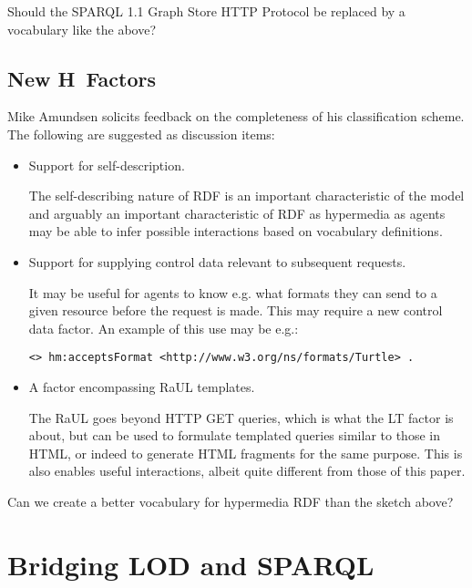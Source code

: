 \documentclass{llncs}
\begin{document}
\begin{question}
Should the SPARQL 1.1 Graph Store HTTP Protocol be replaced by a
vocabulary like the above?
\end{question}

\subsection{New H~Factors}

Mike Amundsen solicits feedback on the completeness of his
classification scheme. The following are suggested as discussion
items:

\begin{itemize}

\item Support for self-description.

The self-describing nature of RDF is an important characteristic of
the model and arguably an important characteristic of RDF as
hypermedia as agents may be able to infer possible interactions based
on vocabulary definitions.

\item Support for supplying control data relevant to subsequent requests.

It may be useful for agents to know e.g. what formats they can send to
a given resource before the request is made. This may require a new
control data factor. An example of this use may be e.g.:

\begin{verbatim}
<> hm:acceptsFormat <http://www.w3.org/ns/formats/Turtle> .
\end{verbatim}

\item A factor encompassing RaUL templates. 

  The RaUL\cite{raul} goes beyond HTTP GET queries, which is what the
  \textsf{LT} factor is about, but can be used to formulate templated
  queries similar to those in HTML, or indeed to generate HTML
  fragments for the same purpose. This is also enables useful
  interactions, albeit quite different from those of this paper.


\end{itemize}


\begin{question}
Can we create a better vocabulary for hypermedia RDF than the sketch above?
\end{question}


\section{Bridging LOD and SPARQL}
\end{document}
